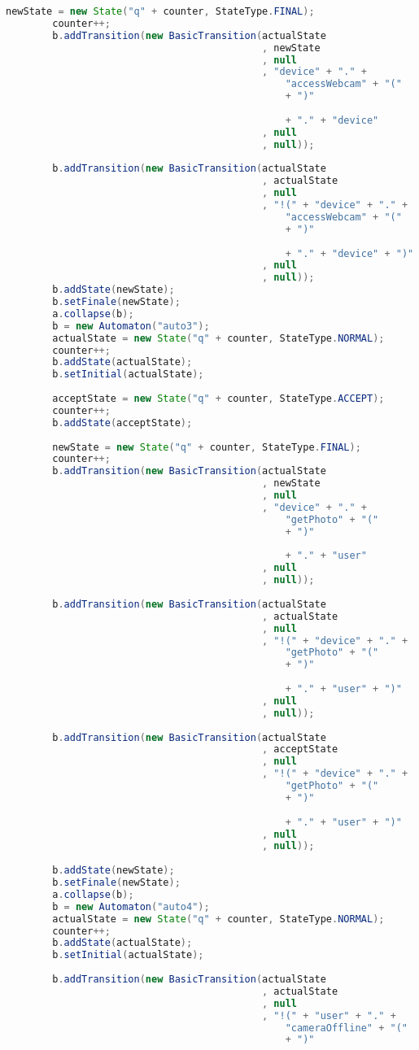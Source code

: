 \begin{lstlisting}[language=java, caption={\textit{Specification} osztály.},captionpos=b,label=specification_class]
		newState = new State("q" + counter, StateType.FINAL);
		counter++;
		b.addTransition(new BasicTransition(actualState
											, newState
											, null
											, "device" + "." +	
												"accessWebcam" + "("
												+ ")"
												
												+ "." + "device"
											, null
											, null));
											
		b.addTransition(new BasicTransition(actualState
											, actualState
											, null
											, "!(" + "device" + "." +	
												"accessWebcam" + "("
												+ ")"
												
												+ "." + "device" + ")"
											, null
											, null));
		b.addState(newState);
		b.setFinale(newState);
		a.collapse(b);
		b = new Automaton("auto3");
		actualState = new State("q" + counter, StateType.NORMAL);
		counter++;
		b.addState(actualState);
		b.setInitial(actualState);
		
		acceptState = new State("q" + counter, StateType.ACCEPT);
		counter++;
		b.addState(acceptState);
		
		newState = new State("q" + counter, StateType.FINAL);
		counter++;
		b.addTransition(new BasicTransition(actualState
											, newState
											, null
											, "device" + "." +	
												"getPhoto" + "("
												+ ")"
												
												+ "." + "user"
											, null
											, null));
											
		b.addTransition(new BasicTransition(actualState
											, actualState
											, null
											, "!(" + "device" + "." +	
												"getPhoto" + "("
												+ ")"
												
												+ "." + "user" + ")"
											, null
											, null));
											
		b.addTransition(new BasicTransition(actualState
											, acceptState
											, null
											, "!(" + "device" + "." +	
												"getPhoto" + "("
												+ ")"
												
												+ "." + "user" + ")"
											, null
											, null));
										
		b.addState(newState);
		b.setFinale(newState);
		a.collapse(b);
		b = new Automaton("auto4");
		actualState = new State("q" + counter, StateType.NORMAL);
		counter++;
		b.addState(actualState);
		b.setInitial(actualState);
		
		b.addTransition(new BasicTransition(actualState
											, actualState
											, null
											, "!(" + "user" + "." +	
												"cameraOffline" + "("
												+ ")"
												

\end{lstlisting}

